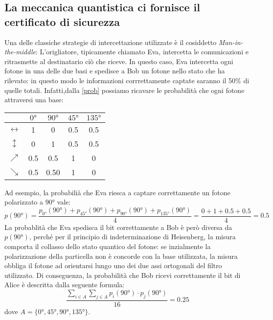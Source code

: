 \documentclass[italian,A4,12pt]{article}
\begin{document}
    \subsection{La meccanica quantistica ci fornisce il certificato di sicurezza}
    Una delle classiche strategie di intercettazione utilizzate è il cosiddetto \textit{Man-in-the-middle}: L'origliatore, tipicamente chiamato Eva, intercetta le comunicazioni e ritrasmette al destinatario ciò che riceve.
    In questo caso, Eva intercetta ogni fotone in una delle due basi e spedisce a Bob un fotone nello stato che ha rilevato:
    in questo modo le informazioni corrrettamente captate saranno il 50\% di quelle totali.
    Infatti,dalla \eqref{prob} possiamo ricavare le probabilità che ogni fotone attraversi una base:
    \begin{center}
      \begin{tabular}{|c|c|c|c|c|}
        \hline
        &$\ang{0}$&$\ang{90}$&$\ang{45}$&$\ang{135}$\\
        \hline
        $\leftrightarrow$&1&0&0.5&0.5\\
        \hline
        $\updownarrow$&0&1&0.5&0.5\\
        \hline
        $\nearrow$&0.5&0.5&1&0\\
        \hline
        $\searrow$&0.5&0.50&1&0\\
        \hline
      \end{tabular}
    \end{center}
    Ad esempio, la probabilià che Eva riesca a captare correttamente un fotone polarizzato a $\ang{90}$ vale:
    $$p(\ang{90})=\frac{p_{\ang{0}}(\ang{90})+p_{\ang{45}}(\ang{90})+p_{\ang{90}}(\ang{90})+p_{\ang{135}}(\ang{90})}{4}=\frac{0+1+0.5+0.5}{4}=0.5$$
    La probablità che Eva spedisca il bit correttamente a Bob è però diversa da $p(\ang{90})$, perché per il principio di indeterminazione di Heisenberg, la misura comporta il collasso dello stato quantico del fotone: se inzialmente la polarizzazione della particella non è concorde con la base utilizzata, la misura obbliga il fotone ad orientarsi lungo uno dei due assi ortogonali del filtro utilizzato.
    Di conseguenza, la probabilità che Bob ricevi correttamente il bit di Alice è descritta dalla seguente formula:
    \begin{equation*}
      \frac{\displaystyle\sum_{i\in A}\displaystyle\sum_{j\in A} p_i(\ang{90})\cdot p_j(\ang{90})}{16}=0.25
    \end{equation*}
    dove $A=\{\ang{0},\ang{45},\ang{90},\ang{135}\}$.\\
\end{document}
